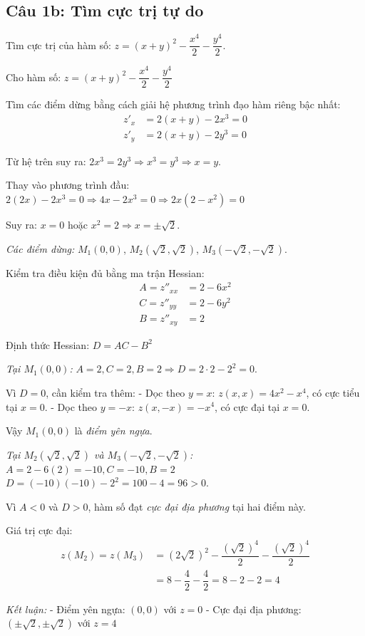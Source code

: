 \subsection*{Câu 1b: Tìm cực trị tự do}

\begin{questionbox}
Tìm cực trị của hàm số: $z = (x + y)^2 - \dfrac{x^4}{2} - \dfrac{y^4}{2}$.
\end{questionbox}

\begin{solution}
Cho hàm số: $z = (x + y)^2 - \dfrac{x^4}{2} - \dfrac{y^4}{2}$

\textit{} Tìm các điểm dừng bằng cách giải hệ phương trình đạo hàm riêng bậc nhất:
\begin{align*}
    z'_x &= 2(x + y) - 2x^3 = 0 \\
    z'_y &= 2(x + y) - 2y^3 = 0
\end{align*}

Từ hệ trên suy ra: $2x^3 = 2y^3 \Rightarrow x^3 = y^3 \Rightarrow x = y$.

Thay vào phương trình đầu: $2(2x) - 2x^3 = 0 \Rightarrow 4x - 2x^3 = 0 \Rightarrow 2x(2 - x^2) = 0$

Suy ra: $x = 0$ hoặc $x^2 = 2 \Rightarrow x = \pm\sqrt{2}$.

\textit{Các điểm dừng:} $M_1(0, 0)$, $M_2(\sqrt{2}, \sqrt{2})$, $M_3(-\sqrt{2}, -\sqrt{2})$.

\textit{} Kiểm tra điều kiện đủ bằng ma trận Hessian:
\begin{align*}
    A = z''_{xx} &= 2 - 6x^2 \\
    C = z''_{yy} &= 2 - 6y^2 \\
    B = z''_{xy} &= 2
\end{align*}

Định thức Hessian: $D = AC - B^2$

\textit{Tại $M_1(0, 0)$:}
$A = 2, C = 2, B = 2 \Rightarrow D = 2 \cdot 2 - 2^2 = 0$.

Vì $D = 0$, cần kiểm tra thêm:
- Dọc theo $y = x$: $z(x, x) = 4x^2 - x^4$, có cực tiểu tại $x = 0$.
- Dọc theo $y = -x$: $z(x, -x) = -x^4$, có cực đại tại $x = 0$.

Vậy $M_1(0, 0)$ là \textit{điểm yên ngựa}.

\textit{Tại $M_2(\sqrt{2}, \sqrt{2})$ và $M_3(-\sqrt{2}, -\sqrt{2})$:}
$A = 2 - 6(2) = -10, C = -10, B = 2$
$D = (-10)(-10) - 2^2 = 100 - 4 = 96 > 0$.

Vì $A < 0$ và $D > 0$, hàm số đạt \textit{cực đại địa phương} tại hai điểm này.

Giá trị cực đại: 
\begin{align*}
    z(M_2) = z(M_3) &= (2\sqrt{2})^2 - \dfrac{(\sqrt{2})^4}{2} - \dfrac{(\sqrt{2})^4}{2} \\
    &= 8 - \dfrac{4}{2} - \dfrac{4}{2} = 8 - 2 - 2 = 4
\end{align*}

\textit{Kết luận:} 
- Điểm yên ngựa: $(0, 0)$ với $z = 0$
- Cực đại địa phương: $(\pm\sqrt{2}, \pm\sqrt{2})$ với $z = 4$
\end{solution}

